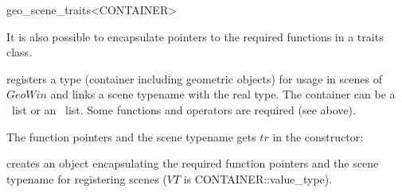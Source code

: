 \begin{ccClassTemplate}{geo_scene_traits<CONTAINER>}

\ccDefinition

It is also possible to encapsulate pointers to the required functions in a traits class.

{ registers a type (container including geometric objects) for usage
  in scenes of $GeoWin$
  and links a scene typename with the real type. The container can be a \leda\ list 
  or an \stl\ list. Some functions and operators are required (see above).
}

The function pointers and the scene typename gets $tr$ in the constructor:
 
\ccCreation

{creates an object encapsulating the required function pointers and the scene typename
for registering scenes ($VT$ is CONTAINER::value\_type).}

\end{ccClassTemplate}

\ccParDims

